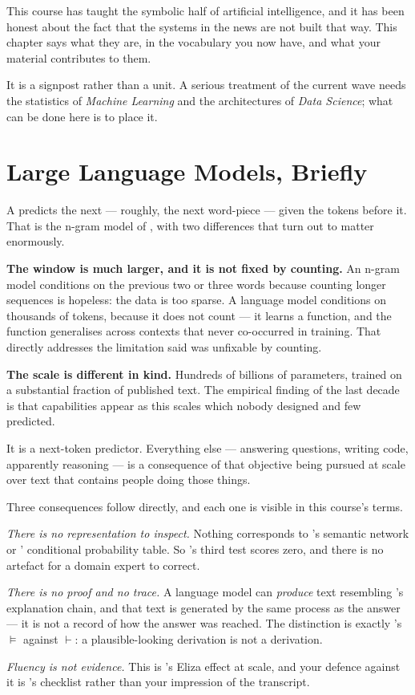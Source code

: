 This course has taught the symbolic half of artificial intelligence, and it has been
honest about the fact that the systems in the news are not built that way. This
chapter says what they are, in the vocabulary you now have, and what your material
contributes to them.

It is a signpost rather than a unit. A serious treatment of the current wave needs
the statistics of \emph{Machine Learning} and the architectures of \emph{Data
Science}; what can be done here is to place it.

\section{Large Language Models, Briefly}

A  predicts the next  --- roughly, the next
word-piece --- given the tokens before it. That is the n-gram model of
, with two differences that turn out to matter enormously.

\textbf{The window is much larger, and it is not fixed by counting.} An n-gram
model conditions on the previous two or three words because counting longer
sequences is hopeless: the data is too sparse. A language model conditions on
thousands of tokens, because it does not count --- it learns a function, and the
function generalises across contexts that never co-occurred in training. That
directly addresses the limitation  said was unfixable by counting.

\textbf{The scale is different in kind.} Hundreds of billions of parameters,
trained on a substantial fraction of published text. The empirical finding of the
last decade is that capabilities appear as this scales which nobody designed and
few predicted.

\begin{alertbox}
It is a next-token predictor. Everything else --- answering questions, writing code,
apparently reasoning --- is a consequence of that objective being pursued at scale
over text that contains people doing those things.

Three consequences follow directly, and each one is visible in this course's terms.

\emph{There is no representation to inspect.} Nothing corresponds to
's semantic network or ' conditional probability table.
So 's third test scores zero, and there is no artefact for a
domain expert to correct.

\emph{There is no proof and no trace.} A language model can \emph{produce} text
resembling 's explanation chain, and that text is generated by the
same process as the answer --- it is not a record of how the answer was reached. The
distinction is exactly 's $\models$ against $\vdash$: a
plausible-looking derivation is not a derivation.

\emph{Fluency is not evidence.} This is 's Eliza effect at scale, and
your defence against it is 's checklist rather than your
impression of the transcript.
\end{alertbox}

